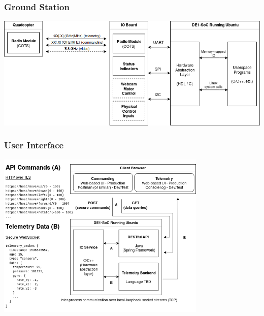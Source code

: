\documentclass{beamer}
\begin{document}
\begin{frame}
\frametitle{Ground Station}
\begin{center}
\includegraphics[width=\linewidth]{../src/im/ground_station}
\end{center}
\end{frame}

\begin{frame}
\frametitle{User Interface}
\begin{center}
\includegraphics[height=225pt,width=\linewidth,keepaspectratio]{../src/im/display_controller}
\end{center}
\end{frame}
\end{document}
